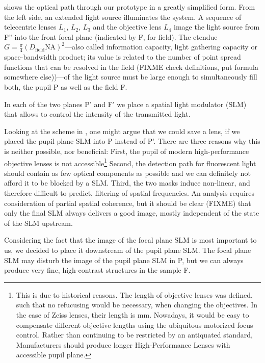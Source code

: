  shows the optical path through our prototype
in a greatly simplified form.  From the left side, an extended light
source illuminates the system. A sequence of telecentric lenses $L_1$,
$L_2$, $L_3$ and the objective lens $L_4$ image the light source from
F'' into the front focal plane (indicated by F, for field). The
etendue $G=\frac{\pi}{4}(D_\textrm{field}\textrm{NA})^2$---also called
information capacity, light gathering capacity or space-bandwidth
product; its value is related to the number of point spread functions
that can be resolved in the field (FIXME check definitions, put formula somewhere else))---of the
light source must be large enough to simultaneously fill both, the pupil P as well as
the field F.

In each of the two planes P' and F' we place a spatial light modulator (SLM)
that allows to control the intensity of the transmitted light.

Looking at the scheme in , one might argue
that we could save a lens, if we placed the pupil plane SLM into P
instead of P'. There are three reasons why this is neither possible,
nor beneficial: First, the pupil of modern high-performance objective
lenses is not accessible\footnote{This is due to historical reasons.
  The length of objective lenses was defined, such that no refucusing
  would be necessary, when changing the objectives. In the case of
  Zeiss lenses, their length is \unit[45]{mm}. Nowadays, it would be
  easy to compensate different objective lengths using the ubiquitous
  motorized focus control.  Rather than continuing to be restricted by
  an antiquated standard, Manufacturers should produce longer
  High-Performance Lenses with accessible pupil plane.}  Second, the
detection path for fluorescent light should contain as few optical
components as possible and we can definitely not afford it to be
blocked by a SLM.  Third, the two masks induce non-linear, and
therefore difficult to predict, filtering of spatial frequencies. An
analysis requires consideration of partial spatial coherence, but it
should be clear (FIXME) that only the final SLM always delivers a good
image, mostly independent of the state of the SLM upstream.

Considering the fact that the image of the focal plane SLM is most
important to us, we decided to place it downstream of the pupil plane
SLM. The focal plane SLM may disturb the image of the pupil plane SLM
in P, but we can always produce very
fine, high-contrast structures in the sample F.

